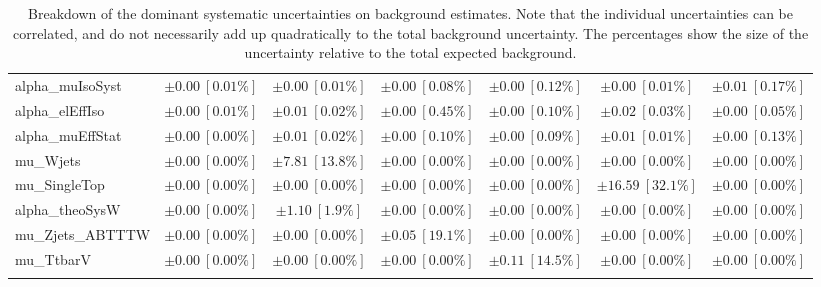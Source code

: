 \begin{sidewaystable}
\begin{center}
\begin{tabular*}{\textwidth}{@{\extracolsep{\fill}}lcccccc}
alpha\_muIsoSyst         & $\pm 0.00\ [0.01\%] $          & $\pm 0.00\ [0.01\%] $          & $\pm 0.00\ [0.08\%] $          & $\pm 0.00\ [0.12\%] $          & $\pm 0.00\ [0.01\%] $          & $\pm 0.01\ [0.17\%] $       \\
alpha\_elEffIso         & $\pm 0.00\ [0.01\%] $          & $\pm 0.01\ [0.02\%] $          & $\pm 0.00\ [0.45\%] $          & $\pm 0.00\ [0.10\%] $          & $\pm 0.02\ [0.03\%] $          & $\pm 0.00\ [0.05\%] $       \\
alpha\_muEffStat         & $\pm 0.00\ [0.00\%] $          & $\pm 0.01\ [0.02\%] $          & $\pm 0.00\ [0.10\%] $          & $\pm 0.00\ [0.09\%] $          & $\pm 0.01\ [0.01\%] $          & $\pm 0.00\ [0.13\%] $       \\
mu\_Wjets         & $\pm 0.00\ [0.00\%] $          & $\pm 7.81\ [13.8\%] $          & $\pm 0.00\ [0.00\%] $          & $\pm 0.00\ [0.00\%] $          & $\pm 0.00\ [0.00\%] $          & $\pm 0.00\ [0.00\%] $       \\
mu\_SingleTop         & $\pm 0.00\ [0.00\%] $          & $\pm 0.00\ [0.00\%] $          & $\pm 0.00\ [0.00\%] $          & $\pm 0.00\ [0.00\%] $          & $\pm 16.59\ [32.1\%] $          & $\pm 0.00\ [0.00\%] $       \\
alpha\_theoSysW         & $\pm 0.00\ [0.00\%] $          & $\pm 1.10\ [1.9\%] $          & $\pm 0.00\ [0.00\%] $          & $\pm 0.00\ [0.00\%] $          & $\pm 0.00\ [0.00\%] $          & $\pm 0.00\ [0.00\%] $       \\
mu\_Zjets\_ABTTTW         & $\pm 0.00\ [0.00\%] $          & $\pm 0.00\ [0.00\%] $          & $\pm 0.05\ [19.1\%] $          & $\pm 0.00\ [0.00\%] $          & $\pm 0.00\ [0.00\%] $          & $\pm 0.00\ [0.00\%] $       \\
mu\_TtbarV         & $\pm 0.00\ [0.00\%] $          & $\pm 0.00\ [0.00\%] $          & $\pm 0.00\ [0.00\%] $          & $\pm 0.11\ [14.5\%] $          & $\pm 0.00\ [0.00\%] $          & $\pm 0.00\ [0.00\%] $       \\
\noalign{\smallskip}\hline\noalign{\smallskip}
\end{tabular*}
\end{center}
\caption[Breakdown of uncertainty on background estimates]{
Breakdown of the dominant systematic uncertainties on background estimates.
Note that the individual uncertainties can be correlated, and do not necessarily add up quadratically to 
the total background uncertainty. The percentages show the size of the uncertainty relative to the total expected background.
\label{table.results.bkgestimate.uncertainties.VRW_bybkg}}
\end{sidewaystable}
%